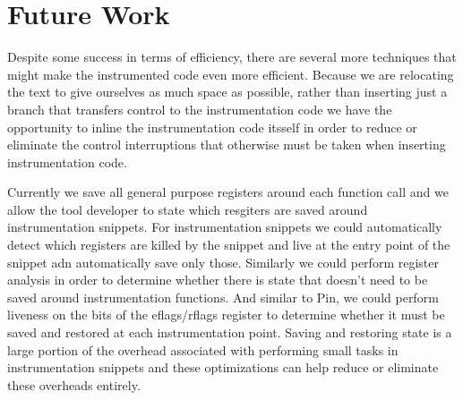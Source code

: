 \section{Future Work}

Despite some success in terms of efficiency, there are several more techniques
that might make the instrumented code even more efficient. Because we are relocating
the text to give ourselves as much space as possible, rather than inserting just a branch
that transfers control to the instrumentation code we have the opportunity to inline
the instrumentation code itsself in order to reduce  or eliminate the control interruptions
that otherwise must be taken when inserting instrumentation code.

Currently we save all general purpose registers around each function call and we allow the
tool developer to state which resgiters are saved around instrumentation snippets. For instrumentation
snippets we could automatically detect which registers are killed by the snippet and live at the entry point
of the snippet adn automatically save only those. Similarly we could perform register analysis in order to determine whether there is
state that doesn't need to be saved around instrumentation functions. And similar to Pin, we could perform
liveness on the bits of the eflags/rflags register to determine whether it must be saved and
restored at each instrumentation point. Saving and restoring state is a large portion of the overhead associated with performing
small tasks in instrumentation snippets and these optimizations can help reduce or eliminate these overheads
entirely.

